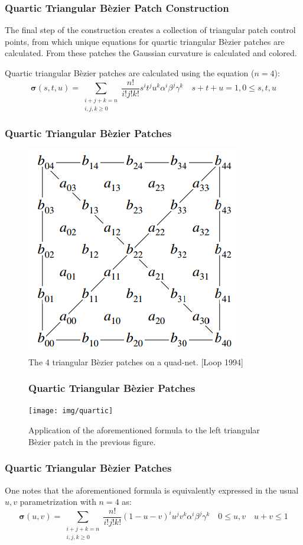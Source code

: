 \documentclass[11pt]{beamer}
\begin{document}
	\begin{frame}
		\frametitle{Quartic Triangular B\`ezier Patch Construction}
		The final step of the construction creates a collection of triangular patch control points, from which unique equations for quartic triangular B\`ezier patches are calculated. From these patches the Gaussian curvature is calculated and colored.   
		
		\vspace{0.25in}
		Quartic triangular B\`ezier patches are calculated using the equation ($n=4$): 
		$$\bm{\sigma}(s,t,u) = \displaystyle \sum_{\begin{smallmatrix} i+j+k=n \\ i,j,k \ge 0\end{smallmatrix}} \frac{n!}{i!j!k!} s^i t^j u^k \alpha^i \beta^j \gamma^k \quad s + t + u = 1, 0 \le s,t,u$$ 
	\end{frame}

	\begin{frame}
		\frametitle{Quartic Triangular B\`ezier Patches}
		\begin{figure}[h]
			\centering
			\includegraphics[width=.4\linewidth]{img/bezier_loop}
			\caption{The 4 triangular B\`ezier patches on a quad-net. [Loop 1994]}	
		\end{figure}
	\end{frame}	

	\begin{frame}
		\begin{figure}[h]
			\frametitle{Quartic Triangular B\`ezier Patches}
			\centering
			\texttt{[image: img/quartic]}
			\caption{Application of the aforementioned formula to the left triangular B\`ezier patch in the previous figure.}
		\end{figure}
	\end{frame}

	\begin{frame}
		\frametitle{Quartic Triangular B\`ezier Patches}
		One notes that the aforementioned formula is equivalently expressed in the usual $u,v$ parametrization with $n=4$ as: 
		$$\displaystyle \bm{\sigma}(u,v) = \sum_{\begin{smallmatrix} i+j+k=n \\ i,j,k \ge 0\end{smallmatrix}} \frac{n!}{i!j!k!} (1-u-v)^i u^j v^k \alpha^i \beta^j \gamma^k \quad0 \le u,v \quad u + v \le 1$$
	\end{frame}
\end{document}
